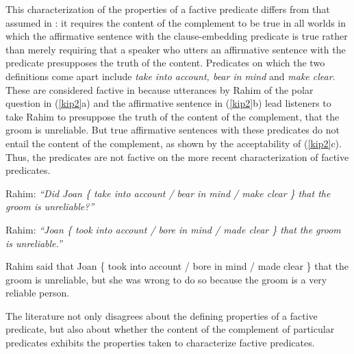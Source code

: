 \documentclass[11pt,fleqn]{article}
\newcommand{\6}{\mbox{$[\hspace*{-.6mm}[$}}
\newcommand{\9}{\mbox{$]\hspace*{-.6mm}]$}}
\begin{document}
This characterization of the properties of a factive predicate differs from that assumed in \citealt{kiparsky-kiparsky70}: it requires the content of the complement to be true in all worlds in which the affirmative sentence with the clause-embedding predicate is true rather than merely requiring that a speaker who utters an affirmative sentence with the predicate presupposes the truth of the content.  Predicates on which the two definitions come apart include {\em take into account, bear in mind} and {\em make clear}. These are considered factive in \citealt{kiparsky-kiparsky70} because utterances by Rahim of the polar question in (\ref{kip2}a) and the affirmative sentence in (\ref{kip2}b) lead listeners to take Rahim to presuppose the truth of the content of the complement, that the groom is unreliable. But true affirmative sentences with these predicates do not entail the content of the complement, as shown by the acceptability of (\ref{kip2}c). Thus, the predicates are not factive on the more recent characterization of factive predicates.

\begin{exe}
\ex\label{kip2}
\begin{xlist}
\ex Rahim: {\em ``Did Joan \{ take into account / bear in mind / make clear \} that the groom is unreliable?''}

\ex Rahim: {\em ``Joan  \{ took into account / bore in mind / made clear \}  that the groom is unreliable.''} 

\ex Rahim said that Joan  \{ took into account / bore in mind / made clear \} that the groom is unreliable, but she was wrong to do so because the groom is a very reliable person.
\end{xlist}
\end{exe}

The literature not only disagrees about the defining properties of a factive predicate, but also about whether the content of the complement of particular predicates exhibits the properties taken to characterize factive predicates. 
\end{document}
